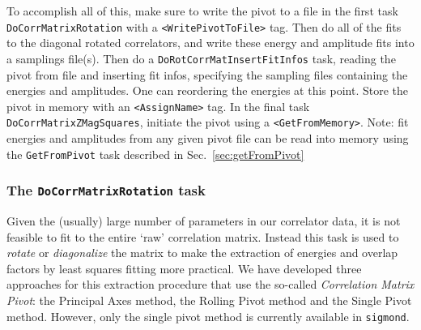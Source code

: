 \documentclass[12pt]{article}
\newcommand{\vb}{\texttt}
\begin{document}
To accomplish all of this, make sure to write the pivot to a file in the     
first task \newline \vb{DoCorrMatrixRotation} with a \vb{<WritePivotToFile>} tag.  Then       
do all of the fits to the diagonal rotated correlators, and write these      
energy and amplitude fits into a samplings file(s).  Then do a               
\vb{DoRotCorrMatInsertFitInfos} task, reading the pivot from file and inserting 
fit infos, specifying the sampling files containing the energies and         
amplitudes.  One can reordering the energies at this point.  Store the pivot 
in memory with an \vb{<AssignName>} tag. In the final task                        
\vb{DoCorrMatrixZMagSquares}, initiate the pivot using a \vb{<GetFromMemory>}.       
Note: fit energies and amplitudes from any given pivot file can be read into
memory using the \vb{GetFromPivot} task described in Sec.~\ref{sec:getFromPivot}

\subsubsection{The \vb{DoCorrMatrixRotation} task} 
\label{sec:rotation}
Given the (usually) large number of parameters in our correlator data,
it is not feasible to fit to the entire `raw' correlation matrix. Instead
this task is used to \textit{rotate} or \textit{diagonalize} the matrix to
make the extraction of energies and overlap factors by least squares fitting
more practical. We have developed three approaches for this extraction procedure that use
the so-called \textit{Correlation Matrix Pivot}: the Principal Axes method, the
Rolling Pivot method and the Single Pivot method.  However, only the single pivot
method is currently available in \vb{sigmond}.
\end{document}
